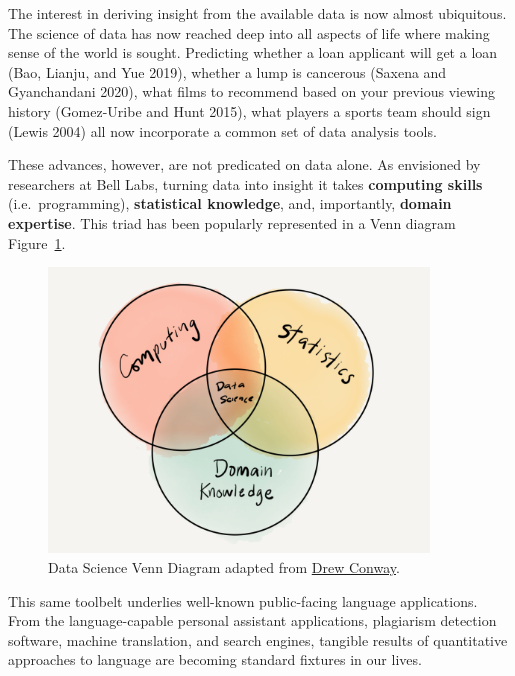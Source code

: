 \documentclass[
  letterpaper,
]{latex/krantz}
\begin{document}
The interest in deriving insight from the available data is now almost
ubiquitous. The science of data has now reached deep into all aspects of
life where making sense of the world is sought. Predicting whether a
loan applicant will get a loan (Bao, Lianju, and Yue 2019), whether a
lump is cancerous (Saxena and Gyanchandani 2020), what films to
recommend based on your previous viewing history (Gomez-Uribe and Hunt
2015), what players a sports team should sign (Lewis 2004) all now
incorporate a common set of data analysis tools.

These advances, however, are not predicated on data alone. As envisioned
by researchers at Bell Labs, turning data into insight it takes
\textbf{computing skills} (i.e.~programming), \textbf{statistical
knowledge}, and, importantly, \textbf{domain expertise}. This triad has
been popularly represented in a Venn diagram
Figure~\ref{fig-intro-data-science-venn}.

\begin{figure}[h]

{\centering \includegraphics[width=0.9\textwidth,height=\textheight]{./figures/text-analysis/data-science-venn-paper.png}

}

\caption{\label{fig-intro-data-science-venn}Data Science Venn Diagram
adapted from
\href{http://drewconway.com/zia/2013/3/26/the-data-science-venn-diagram}{Drew
Conway}.}

\end{figure}

This same toolbelt underlies well-known public-facing language
applications. From the language-capable personal assistant applications,
plagiarism detection software, machine translation, and search engines,
tangible results of quantitative approaches to language are becoming
standard fixtures in our lives.
\end{document}
